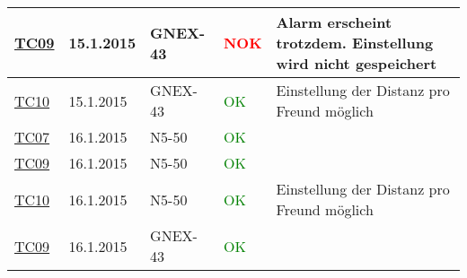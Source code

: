 \begin{center}
\begin{tabular}{ | l | l | l | l | p{7cm} | }
	\hline
	\hyperlink{TC09}{TC09} & 15.1.2015 & GNEX-43 & \textcolor{red}{NOK} & Alarm erscheint trotzdem. Einstellung wird nicht gespeichert\\
	\hline
	\hyperlink{TC10}{TC10} & 15.1.2015 & GNEX-43 & \textcolor{green}{OK} & Einstellung der Distanz pro Freund möglich\\
	\hline
	\hyperlink{TC07}{TC07} & 16.1.2015 & N5-50 & \textcolor{green}{OK} & \\
	\hline
	\hyperlink{TC09}{TC09} & 16.1.2015 & N5-50 & \textcolor{green}{OK} & \\
	\hline
	\hyperlink{TC10}{TC10} & 16.1.2015 & N5-50 & \textcolor{green}{OK} & Einstellung der Distanz pro Freund möglich\\
	\hline
	\hyperlink{TC09}{TC09} & 16.1.2015 & GNEX-43 & \textcolor{green}{OK} & \\
	\hline
	\end{tabular}
\end{center}



